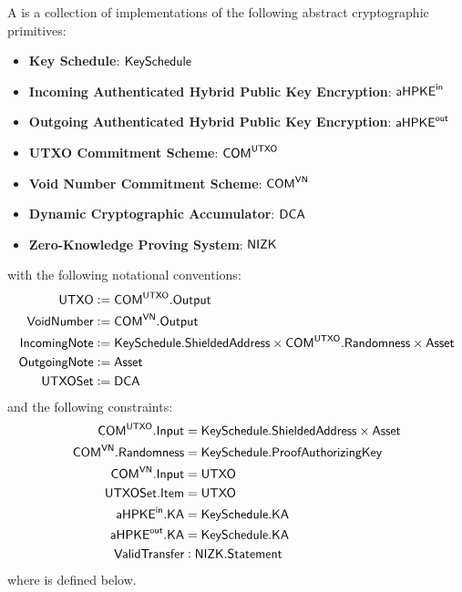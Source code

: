 \begin{definition}
    A \TransferConfiguration{} is a collection of implementations of the following abstract cryptographic primitives:
    \begin{itemize}
        \item \textbf{Key Schedule}: ${\textsf{KeySchedule}}$
        \item \textbf{Incoming Authenticated Hybrid Public Key Encryption}: ${{\textsf{aHPKE}}^\textsf{in}}$
        \item \textbf{Outgoing Authenticated Hybrid Public Key Encryption}: ${{\textsf{aHPKE}}^\textsf{out}}$
        \item \textbf{UTXO Commitment Scheme}: ${\textsf{COM}}^{{\textsf{UTXO}}}$
        \item \textbf{Void Number Commitment Scheme}: ${\textsf{COM}}^{{\textsf{VN}}}$
        \item \textbf{Dynamic Cryptographic Accumulator}: ${\textsf{DCA}}$
        \item \textbf{Zero-Knowledge Proving System}: ${\textsf{NIZK}}$
    \end{itemize}
    with the following notational conventions:
    \begin{align*}
        {\textsf{UTXO}}         &:= {\textsf{COM}}^{{\textsf{UTXO}}}.{\textsf{Output}} \\
        {\textsf{VoidNumber}}   &:= {\textsf{COM}}^{{\textsf{VN}}}.{\textsf{Output}} \\
        {\textsf{IncomingNote}} &:= {\textsf{KeySchedule}}.{\textsf{ShieldedAddress}} \times {\textsf{COM}}^{\textsf{UTXO}}.{\textsf{Randomness}} \times {\textsf{Asset}} \\
        {\textsf{OutgoingNote}} &:= {\textsf{Asset}} \\
        {\textsf{UTXOSet}}      &:= {\textsf{DCA}}
    \end{align*}
    and the following constraints:
    \begin{align*}
        {\textsf{COM}}^{{\textsf{UTXO}}}.{\textsf{Input}}    &= {\textsf{KeySchedule}}.{\textsf{ShieldedAddress}} \times {\textsf{Asset}} \\
        {\textsf{COM}}^{{\textsf{VN}}}.{\textsf{Randomness}} &= {\textsf{KeySchedule}}.{\textsf{ProofAuthorizingKey}} \\
        {\textsf{COM}}^{{\textsf{VN}}}.{\textsf{Input}}      &= {\textsf{UTXO}} \\
        {\textsf{UTXOSet}}.{\textsf{Item}}         &= {\textsf{UTXO}} \\
        {{\textsf{aHPKE}}^\textsf{in}}.{\textsf{KA}}           &= {\textsf{KeySchedule}}.{\textsf{KA}} \\
        {{\textsf{aHPKE}}^\textsf{out}}.{\textsf{KA}}           &= {\textsf{KeySchedule}}.{\textsf{KA}} \\
        {\textsf{ValidTransfer}}         &: {\textsf{NIZK}}.{\textsf{Statement}} \\
    \end{align*}
    where \ValidTransfer{} is defined below.
\end{definition}

